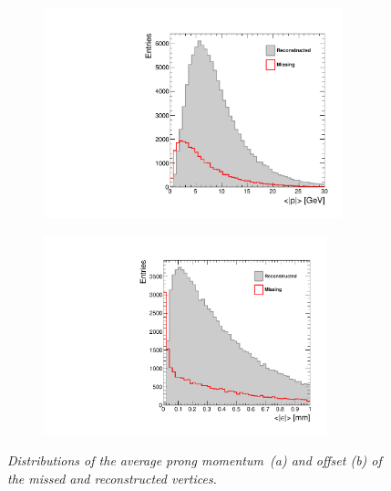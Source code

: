 \begin{figure}[h]
\centering
\begin{subfigure}{0.5\textwidth}
    \includegraphics[width=0.95\textwidth]{ILD/plots/rec-missed-p-vtx.pdf}
\caption{\label{fig:RecMissedParams_a_3} }
\end{subfigure}%
  \begin{subfigure}{0.5\textwidth}
\centering
    \includegraphics[width=0.9\textwidth]{ILD/plots/rec-missed-s-vtx.pdf}
\caption{\label{fig:RecMissedParams_b_3} }
\end{subfigure}
    \caption{\sl Distributions of the average prong momentum~(a) and offset (b) of the missed and reconstructed vertices. }
    \label{fig:RecMissedParams_3}
\end{figure}

